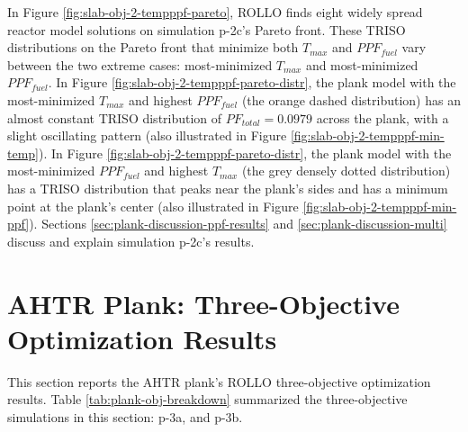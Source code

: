 In Figure \ref{fig:slab-obj-2-tempppf-pareto}, \gls{ROLLO} finds eight widely spread 
reactor model solutions on simulation p-2c's Pareto front. 
These \gls{TRISO} distributions on the Pareto front that minimize both $T_{max}$ 
and $PPF_{fuel}$ vary between the two extreme cases: 
most-minimized $T_{max}$ and most-minimized $PPF_{fuel}$.
In Figure \ref{fig:slab-obj-2-tempppf-pareto-distr}, the plank model with 
the most-minimized $T_{max}$ and highest $PPF_{fuel}$ (the orange dashed distribution) 
has an almost constant TRISO distribution of $PF_{total}=0.0979$ across the plank, 
with a slight oscillating pattern (also illustrated in Figure 
\ref{fig:slab-obj-2-tempppf-min-temp}).
In Figure \ref{fig:slab-obj-2-tempppf-pareto-distr}, the plank model with the
most-minimized $PPF_{fuel}$ and highest $T_{max}$ (the grey densely dotted 
distribution) has a TRISO distribution that peaks near the plank's sides and has 
a minimum point at the plank's center (also illustrated in Figure 
\ref{fig:slab-obj-2-tempppf-min-ppf}). 
Sections \ref{sec:plank-discussion-ppf-results} and \ref{sec:plank-discussion-multi} 
discuss and explain simulation p-2c's results.

\section{AHTR Plank: Three-Objective Optimization Results}
\label{sec:plank-three-obj}
This section reports the \gls{AHTR} plank's \gls{ROLLO} three-objective 
optimization results. 
Table \ref{tab:plank-obj-breakdown} summarized the three-objective simulations in this 
section: p-3a, and p-3b. 

